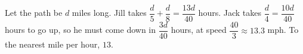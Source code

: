 Let the path be $d$ miles long. Jill takes $\dfrac d5+\dfrac d8=\dfrac{13d}{40}$ hours. Jack takes $\dfrac d4=\dfrac{10d}{40}$ hours to go up, so he must come down in $\dfrac{3d}{40}$ hours, at speed $\dfrac{40}{3}\approx13.3$ mph. To the nearest mile per hour, $\boxed{13}$.

